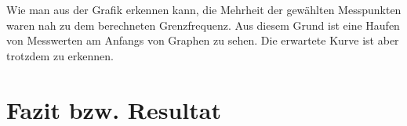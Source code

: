 \documentclass{article}
\begin{document}
\begin{enumerate}[label=\alph*]
         Wie man aus der Grafik erkennen kann, die Mehrheit der gewählten Messpunkten waren nah zu dem 
         berechneten Grenzfrequenz. Aus diesem Grund ist eine Haufen von Messwerten am Anfangs von Graphen
         zu sehen. Die erwartete Kurve ist aber trotzdem zu erkennen. 
        \end{enumerate}

        \section{Fazit bzw. Resultat}
\end{document}
